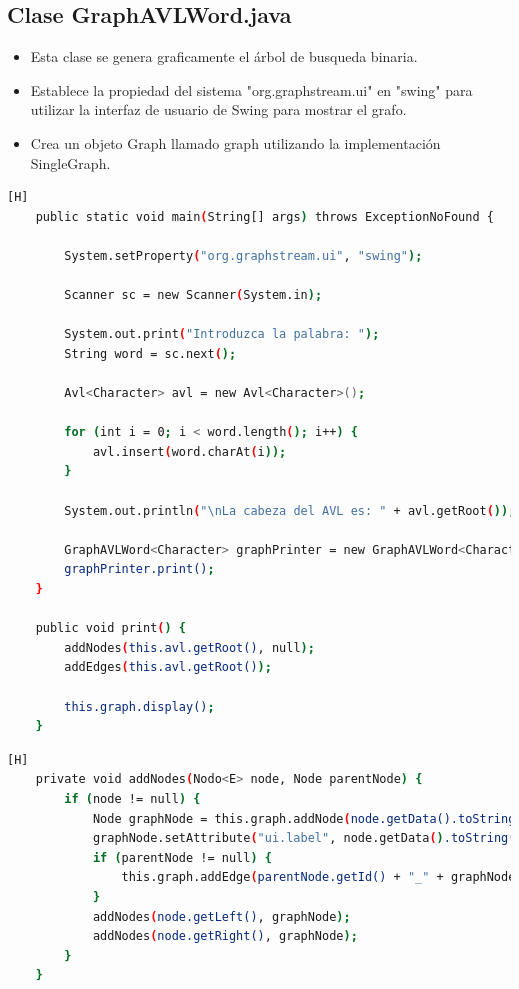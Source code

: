 \documentclass{article}
\begin{document}
	\subsection{Clase GraphAVLWord.java}
	\begin{itemize}
        	\item Esta clase se genera graficamente el árbol de busqueda binaria.
\item Establece la propiedad del sistema "org.graphstream.ui" en "swing" para utilizar la interfaz de usuario de Swing para mostrar el grafo.
	\item Crea un objeto Graph llamado graph utilizando la implementación SingleGraph.
\end{itemize}
	
	\begin{lstlisting}[language=bash,caption={Clase GraphAVLWord: Main}][H]
	public static void main(String[] args) throws ExceptionNoFound {

        System.setProperty("org.graphstream.ui", "swing");

        Scanner sc = new Scanner(System.in);
        
        System.out.print("Introduzca la palabra: ");
        String word = sc.next();
        
        Avl<Character> avl = new Avl<Character>();
        
        for (int i = 0; i < word.length(); i++) {
            avl.insert(word.charAt(i));
        }
        
        System.out.println("\nLa cabeza del AVL es: " + avl.getRoot());

        GraphAVLWord<Character> graphPrinter = new GraphAVLWord<Character>(avl);
        graphPrinter.print();
    }

    public void print() {
        addNodes(this.avl.getRoot(), null);
        addEdges(this.avl.getRoot());
        
        this.graph.display();
    }
	\end{lstlisting}
	\begin{lstlisting}[language=bash,caption={Clase GraphAVLWord: addNodes()}][H]
	private void addNodes(Nodo<E> node, Node parentNode) {
        if (node != null) {
            Node graphNode = this.graph.addNode(node.getData().toString());
            graphNode.setAttribute("ui.label", node.getData().toString());
            if (parentNode != null) {
                this.graph.addEdge(parentNode.getId() + "_" + graphNode.getId(), parentNode, graphNode);
            }
            addNodes(node.getLeft(), graphNode);
            addNodes(node.getRight(), graphNode);
        }
    }
	\end{lstlisting}
\end{document}
